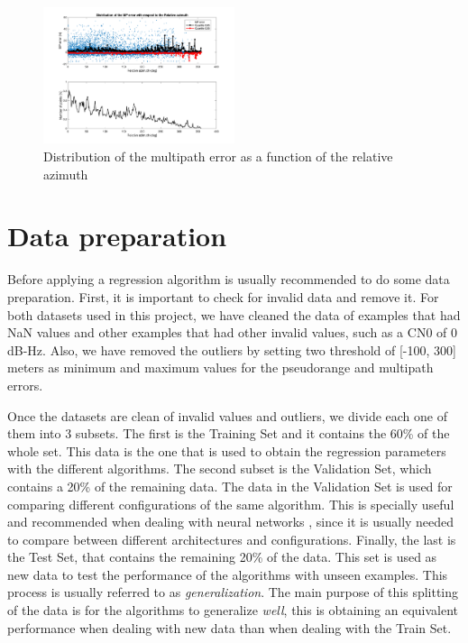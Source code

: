 \documentclass[a4paper, report, oneside, UKenglish]{memoir}
\begin{document}
\begin{figure}[ht]
    \centering
    \includegraphics[width=0.5\textwidth]{data-analysis/mpn_daz.png}
    \caption{Distribution of the multipath error as a function of the relative azimuth}
    \label{fig:mpn_daz}
\end{figure}

\section{Data preparation}
Before applying a regression algorithm is usually recommended to do some data preparation. First, it is important to check for invalid data and remove it. For both datasets used in this project, we have cleaned the data of examples that had NaN values and other examples that had other invalid values, such as a CN0 of 0 dB-Hz. Also, we have removed the outliers by setting two threshold of [-100, 300] meters as minimum and maximum values for the pseudorange and multipath errors.

Once the datasets are clean of invalid values and outliers, we divide each one of them into 3 subsets. The first is the Training Set and it contains the 60\% of the whole set. This data is the one that is used to obtain the regression parameters with the different algorithms. The second subset is the Validation Set, which contains a 20\% of the remaining data. The data in the Validation Set is used for comparing different configurations of the same algorithm. This is specially useful and recommended when dealing with neural networks \cite{aggarwal_neural_2018}, since it is usually needed to compare between different architectures and configurations. Finally, the last is the Test Set, that contains the remaining 20\% of the data. This set is used as new data to test the performance of the algorithms with unseen examples. This process is usually referred to as \textit{generalization}. The main purpose of this splitting of the data is for the algorithms to generalize \textit{well}, this is obtaining an equivalent performance when dealing with new data than when dealing with the Train Set.
\end{document}
